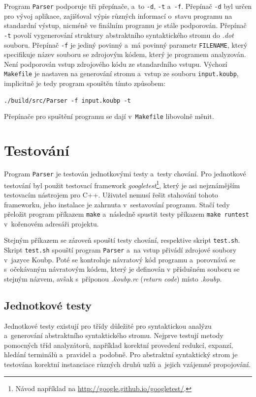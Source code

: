 Program \texttt{Parser} podporuje tři přepínače, a~to \texttt{-d}, \texttt{-t} a~\texttt{-f}.
Přepínač \texttt{-d} byl určen pro vývoj aplikace, zajišťoval výpis různých informací o~stavu programu na standardní výstup, nicméně ve finálním programu je stále podporován.
Přepínač \texttt{-t} povolí vygenerování struktury abstraktního syntaktického stromu do \emph{.dot} souboru.
Přepínač \texttt{-f} je jediný povinný a~má povinný parametr \texttt{FILENAME}, který specifikuje název souboru se zdrojovým kódem, který je programem analyzován.
Není podporován vstup zdrojového kódu ze standardního vstupu.
Výchozí \texttt{Makefile} je nastaven na generování stromu a~vstup ze souboru \texttt{input.koubp}, implicitně je tedy program spouštěn tímto způsobem:
\begin{center}
    \texttt{./build/src/Parser -f input.koubp -t}
\end{center}
Přepínače pro spuštění programu se dají v~\texttt{Makefile} libovolně měnit.


\section{Testování}
Program \texttt{Parser} je testován jednotkovými testy a~testy chování.
Pro jednotkové testování byl použit testovací framework \emph{googletest}\footnote{Návod například na \href{http://google.github.io/googletest/}{http://google.github.io/googletest/}.}, který je asi nejznámějším testovacím nástrojem pro C++.
Uživatel nemusí řešit stahování tohoto frameworku, jeho instalace je zahrnuta v~sestavování programu.
Stačí tedy přeložit program příkazem \texttt{make} a~následně spustit testy příkazem \texttt{make runtest} v~kořenovém adresáři projektu.

Stejným příkazem se zároveň spouští testy chování, respektive skript \texttt{test.sh}.
Skript \texttt{test.sh} spouští program \texttt{Parser} a~na vstup přivádí zdrojové soubory v~jazyce Koubp.
Poté se kontroluje návratový kód programu a~porovnává se s~očekávaným návratovým kódem, který je definován v příslušném souboru se stejným názvem, avšak s~příponou \emph{.koubp.rc} (\emph{return code}) místo \emph{.koubp}.

\subsection*{Jednotkové testy}
Jednotkové testy existují pro třídy důležité pro syntaktickou analýzu a~generování abstraktního syntaktického stromu.
Nejprve testují metody pomocných tříd analyzátorů, například korektní provedení redukcí, expanzí, hledání terminálů a~pravidel a~podobně.
Pro abstraktní syntaktický strom je testována korektní instanciace různých druhů uzlů a~jejich vzájemné propojování.

